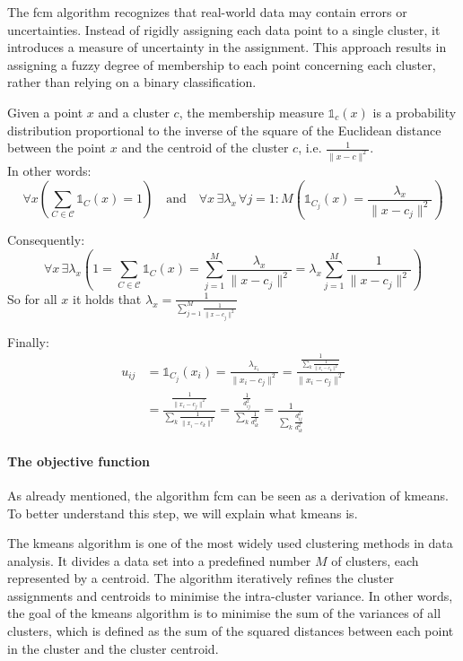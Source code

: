 \begin{remark}
	The \gls{fcm} algorithm recognizes that real-world data may contain errors or uncertainties. Instead of rigidly assigning each data point to a single cluster, it introduces a measure of uncertainty in the assignment. This approach results in assigning a fuzzy degree of membership to each point concerning each cluster, rather than relying on a binary classification.
\end{remark}
\newpage
\begin{definition}\label{def:fuzzy}
	Given a point $x$ and a cluster $c$, the membership measure $\mathds{1}_c(x)$ is a probability distribution proportional to the inverse of the square of the Euclidean distance between the point $x$ and the centroid of the cluster $c$, i.e. $\frac{1}{\|x-c\|^2}$.\\ In other words:
	$$\forall x \left( \sum_{C\in\mathcal{C}}\mathds{1}_C(x)=1 \right) \quad \text{and} \quad \forall x \, \exists \lambda_x \, \forall j=1:M \left(\mathds{1}_{C_j}(x)=\frac{\lambda_x}{\|x-c_j\|^2}\right)$$

		\bigskip\noindent Consequently:
		\[
			\forall x \, \exists \lambda_x \left( 1 = \sum_{C\in\mathcal{C}}\mathds{1}_C(x) = \sum_{j=1}^M\frac{\lambda_x}{\|x-c_j\|^2} = \lambda_x\sum_{j=1}^M\frac{1}{\|x-c_j\|^2}\right)
		\]
		So for all $x$ it holds that $\lambda_x = \frac{1}{\sum_{j=1}^M\frac{1}{\|x-c_j\|^2}}$

		\bigskip\noindent Finally:
		\begin{align*}
			u_{ij} &= \mathds{1}_{C_j}(x_i) = \frac{\lambda_{x_i}}{\|x_i-c_j\|^2} = \frac{\frac{1}{\sum_{k}\frac{1}{\|x_i-c_k\|^2}}}{\|x_i-c_j\|^2} \\
			&= \frac{\frac{1}{\|x_i-c_j\|^2}}{\sum_{k}\frac{1}{\|x_i-c_k\|^2}} = \frac{\frac{1}{d_{ij}^2}}{\sum_{k}\frac{1}{d_{ik}^2}} = \frac{1}{\sum_{k}\frac{d_{ij}^2}{d_{ik}^2}}
		\end{align*}
\end{definition}

\paragraph{The objective function}
	As already mentioned, the algorithm \gls{fcm} can be seen as a derivation of \gls{kmeans}. To better understand this step, we will explain what \gls{kmeans} is.

	\noindent The \gls{kmeans} algorithm is one of the most widely used clustering methods in data analysis. It divides a data set into a predefined number $M$ of clusters, each represented by a centroid. The algorithm iteratively refines the cluster assignments and centroids to minimise the intra-cluster variance. In other words, the goal of the \gls{kmeans} algorithm is to minimise the sum of the variances of all clusters, which is defined as the sum of the squared distances between each point in the cluster and the cluster centroid.

